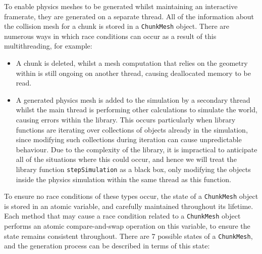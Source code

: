 \documentclass[11pt]{article}
\begin{document}
To enable physics meshes to be generated whilst maintaining an interactive framerate, they are generated on a separate thread. All of the information about the collision mesh for a chunk is stored in a \texttt{ChunkMesh} object. There are numerous ways in which race conditions can occur as a result of this multithreading, for example:
\begin{itemize}
  \item A chunk is deleted, whilst a mesh computation that relies on the geometry within is still ongoing on another thread, causing deallocated memory to be read.
  \item A generated physics mesh is added to the simulation by a secondary thread whilst the main thread is performing other calculations to simulate the world, causing errors within the library. This occurs particularly when library functions are iterating over collections of objects already in the simulation, since modifying such collections during iteration can cause unpredictable behaviour. Due to the complexity of the library, it is impractical to anticipate all of the situations where this could occur, and hence we will treat the library function \texttt{stepSimulation} as a black box, only modifying the objects inside the physics simulation within the same thread as this function.
\end{itemize}
To ensure no race conditions of these types occur, the state of a \texttt{ChunkMesh} object is stored in an atomic variable, and carefully maintained throughout its lifetime. Each method that may cause a race condition related to a \texttt{ChunkMesh} object performs an atomic compare-and-swap operation on this variable, to ensure the state remains consistent throughout. There are 7 possible states of a \texttt{ChunkMesh}, and the generation process can be described in terms of this state:
\end{document}
